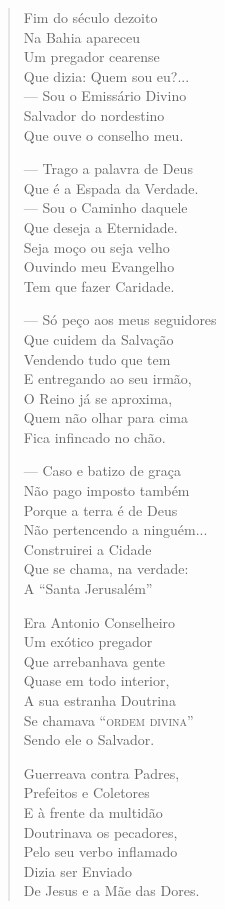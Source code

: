 \begin{verse}
Fim do século dezoito \\
Na Bahia apareceu \\
Um pregador cearense \\
Que dizia: Quem sou eu?... \\
--- Sou o Emissário Divino \\
Salvador do nordestino \\
Que ouve o conselho meu. 

--- Trago a palavra de Deus \\
Que é a Espada da Verdade. \\
--- Sou o Caminho daquele \\
Que deseja a Eternidade. \\
Seja moço ou seja velho \\
Ouvindo meu Evangelho \\
Tem que fazer Caridade. 

--- Só peço aos meus seguidores \\
Que cuidem da Salvação \\
Vendendo tudo que tem \\
E entregando ao seu irmão, \\
O Reino já se aproxima, \\
Quem não olhar para cima \\
Fica infincado no chão. 


--- Caso e batizo de graça \\
Não pago imposto também \\
Porque a terra é de Deus \\
Não pertencendo a ninguém... \\
Construirei a Cidade \\
Que se chama, na verdade: \\
A ``Santa Jerusalém'' 

Era Antonio Conselheiro \\
Um exótico pregador \\
Que arrebanhava gente \\
Quase em todo interior, \\
A sua estranha Doutrina \\
Se chamava ``\textsc{ordem divina}'' \\
Sendo ele o Salvador. 

Guerreava contra Padres, \\
Prefeitos e Coletores \\
E à frente da multidão \\
Doutrinava os pecadores, \\
Pelo seu verbo inflamado \\
Dizia ser Enviado \\
De Jesus e a Mãe das Dores. 


\end{verse}
